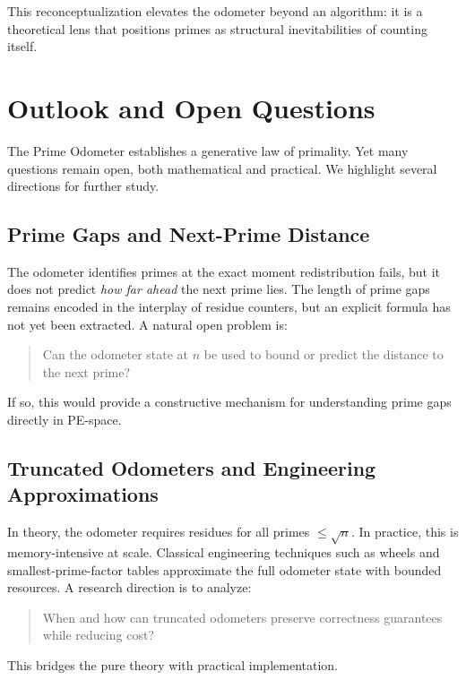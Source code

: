 \documentclass[12pt]{article}
\theoremstyle{definition}
\theoremstyle{remark}
\begin{document}
This reconceptualization elevates the odometer beyond an algorithm: it is a theoretical lens that
positions primes as structural inevitabilities of counting itself.


\section{Outlook and Open Questions}

The Prime Odometer establishes a generative law of primality. Yet many questions remain open,
both mathematical and practical. We highlight several directions for further study.

\subsection{Prime Gaps and Next-Prime Distance}

The odometer identifies primes at the exact moment redistribution fails, but it does not
predict \emph{how far ahead} the next prime lies. The length of prime gaps remains encoded in the
interplay of residue counters, but an explicit formula has not yet been extracted. A natural open
problem is:

\begin{quote}
Can the odometer state at $n$ be used to bound or predict the distance to the next prime?
\end{quote}

If so, this would provide a constructive mechanism for understanding prime gaps directly in
PE-space.

\subsection{Truncated Odometers and Engineering Approximations}

In theory, the odometer requires residues for all primes $\leq \sqrt{n}$. In practice, this is
memory-intensive at scale. Classical engineering techniques such as wheels and smallest-prime-factor
tables approximate the full odometer state with bounded resources. A research direction is to
analyze:

\begin{quote}
When and how can truncated odometers preserve correctness guarantees while reducing cost?
\end{quote}

This bridges the pure theory with practical implementation.
\end{document}
